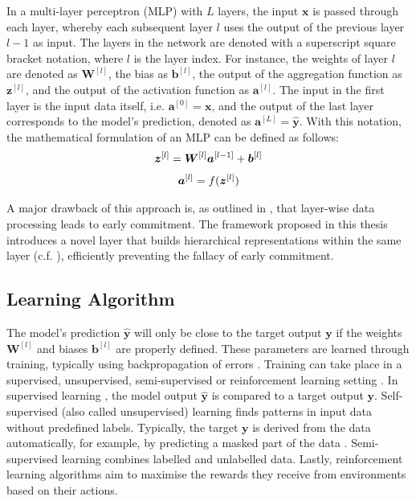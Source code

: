 In a multi-layer perceptron (MLP) with $L$ layers, the input \(\boldsymbol{x}\) is passed through each layer, whereby each subsequent layer \(l\) uses the output of the previous layer \(l-1\) as input.
The layers in the network are denoted with a superscript square bracket notation, where $l$ is the layer index. 
For instance, the weights of layer $l$ are denoted as $\boldsymbol{W}^{[l]}$, the bias as \(\boldsymbol{b}^{[l]}\), the output of the aggregation function as \(\boldsymbol{z}^{[l]}\), and the output of the activation function as \(\boldsymbol{a}^{[l]}\).
The input in the first layer is the input data itself, i.e. $\boldsymbol{a}^{[0]} = \boldsymbol{x}$, and the output of the last layer corresponds to the model's prediction, denoted as $\boldsymbol{a}^{[L]} = \hat{\boldsymbol{y}}$. With this notation, the mathematical formulation of an MLP can be defined as follows:
%
\begin{align}\eqlbl{mlp}
		\boldsymbol{z}^{[l]} = \boldsymbol{W}^{[l]}\boldsymbol{a}^{[l-1]} + \boldsymbol{b}^{[l]}
\end{align}
%
\begin{align}\eqlbl{mlp2}
		\boldsymbol{a}^{[l]} = f(\boldsymbol{z}^{[l]})
\end{align}

A major drawback of this approach is, as outlined in , that layer-wise data processing leads to early commitment.
The framework proposed in this thesis introduces a novel layer that builds hierarchical representations within the same layer (c.f. ), efficiently preventing the fallacy of early commitment.


\subsection{Learning Algorithm}
The model's prediction $\boldsymbol{\hat{y}}$ will only be close to the target output $\boldsymbol{y}$ if the weights $\boldsymbol{W}^{[l]}$ and biases $\boldsymbol{b}^{[l]}$ are properly defined.
These parameters are learned through training, typically using backpropagation of errors .
Training can take place in a supervised, unsupervised, semi-supervised or reinforcement learning setting \cite{russell_artificial_2021, simmler_survey_2021}. In supervised learning \cite{cord_supervised_2008}, the model output $\boldsymbol{\hat{y}}$ is compared to a target output $\boldsymbol{y}$. Self-supervised (also called unsupervised) learning \cite{liu_self-supervised_2021} finds patterns in input data without predefined labels. Typically, the target $\boldsymbol{y}$ is derived from the data automatically, for example, by predicting a masked part of the data . Semi-supervised learning \cite{van_engelen_survey_2020} combines labelled and unlabelled data. Lastly, reinforcement learning algorithms \cite{arulkumaran_deep_2017} aim to maximise the rewards they receive from environments based on their actions.

